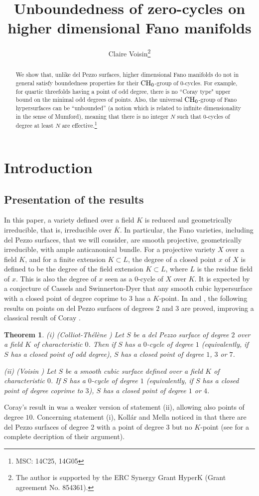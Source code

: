 \documentclass[10pt]{article}
\title{Unboundedness of zero-cycles on  higher dimensional Fano manifolds}
\author{Claire Voisin\footnote{The author is supported by the ERC Synergy Grant HyperK (Grant agreement No. 854361).}
}
\date{}
\newtheorem{theo}{Theorem}[section]
\begin{document}
\maketitle
\begin{abstract} We show that, unlike del Pezzo surfaces, higher dimensional Fano manifolds do not in general satisfy  boundedness properties for their  ${\rm CH}_0$-group of $0$-cycles. For example, for quartic threefolds having a point of odd degree, there is no ``Coray type" upper bound on the minimal odd degrees of points. Also, the universal  ${\rm CH}_0$-group of Fano hypersurfaces    can  be ``unbounded'' (a notion which is related to infinite dimensionality in the sense of Mumford),  meaning that there is no integer $N$ such that $0$-cycles of degree at least $N$ are effective.\footnote{MSC: 14C25, 14G05}
 \end{abstract}
\section{Introduction}
\subsection{Presentation of the results \label{secpresresults}}
In this paper, a variety defined over a field $K$ is  reduced and geometrically irreducible, that is, irreducible over $\overline{K}$. In particular, the Fano varieties, including del Pezzo surfaces, that we will consider, are smooth projective, geometrically irreducible, with ample anticanonical bundle. For a projective variety $X$ over a field $K$, and for a finite extension $K\subset L$,    the degree of a closed point $x$ of $X$  is defined to be  the degree of the field extension $K\subset L$, where $L$ is the residue field of $x$. This is also the degree of $x$ seen as a $0$-cycle of $X$ over $K$. It is expected by a conjecture of Cassels and Swinnerton-Dyer that any smooth cubic hypersurface with a closed  point of degree coprime to $3$ has a $K$-point.
In \cite{colliot} and \cite{voisindelpezzo}, the following results on points on del Pezzo surfaces of degrees $2$ and $3$ are  proved, improving a classical result of Coray \cite{coray}.
\begin{theo}\label{theocorayvoisin}  (i) (Colliot-Th\'{e}l\`{e}ne  \cite{colliot})  Let $S$ be a del Pezzo surface of degree $2$ over a field $K$ of characteristic $0$. Then if $S$ has a $0$-cycle of degree $1$ (equivalently, if $S$ has a closed point of odd degree), $S$ has a closed point of degree $1$, $3$ or $7$.

(ii) (Voisin \cite{voisindelpezzo})   Let $S$ be a smooth cubic surface defined over a field $K$ of characteristic $0$. If $S$ has a $0$-cycle of degree $1$ (equivalently, if $S$ has a closed point of degree coprime to $3$), $S$ has a closed  point of degree $1$ or  $4$.
\end{theo}
 Coray's result    in \cite{coray} was a weaker version of statement (ii), allowing also points  of degree $10$. Concerning statement (i), Koll\'ar and Mella noticed in \cite{kollarmella} that there are del Pezzo surfaces of degree $2$ with a point of degree  $3$ but no $K$-point (see \cite[Remarque 4.3]{colliot} for a complete decription of their argument).
\end{document}
